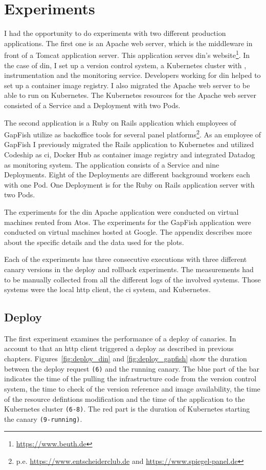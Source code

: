 \section{Experiments}

I had the opportunity to do experiments with two different production applications. The
first one is an Apache web server, which is the middleware in front of a Tomcat
application server. This application serves \gls{din}'s
website\footnote{\url{https://www.beuth.de}}. In the case of \gls{din}, I set up a version
control system, a Kubernetes cluster with \deployer, instrumentation and the monitoring
service. Developers working for \gls{din} helped to set up a container image
registry. I also migrated the Apache web server to be able to run on Kubernetes. The
Kubernetes resources for the Apache web server consisted of a Service and a Deployment
with two Pods.

The second application is a Ruby on Rails application which employees of GapFish utilize
as backoffice tools for several panel
platforms\footnote{p.e. \url{https://www.entscheiderclub.de} and
  \url{https://www.spiegel-panel.de}}. As an employee of GapFish I previously migrated the
Rails application to Kubernetes and utilized Codeship as \gls{ci}, Docker Hub as container
image registry and integrated Datadog as monitoring system. The application consists of a
Service and nine Deployments. Eight of the Deployments are different background workers
each with one Pod. One Deployment is for the Ruby on Rails application server with two
Pods.

The experiments for the \gls{din} Apache application were conducted on virtual machines
rented from Atos. The experiments for the GapFish application were conducted on virtual
machines hosted at Google. The appendix describes more about the specific details and the
data used for the plots.

Each of the experiments has three consecutive executions with three different canary
versions in the deploy and rollback experiments. The measurements had to be manually
collected from all the different logs of the involved systems. Those systems were the local http
client, the \gls{ci} system, \deployer and Kubernetes.

\subsection{Deploy}

The first experiment examines the performance of a deploy of canaries. In account to
that an http client triggered a deploy as described in previous
chapters. Figures~\ref{fig:deploy_din} and \ref{fig:deploy_gapfish} show the duration
between the deploy request \texttt{(6)} and the running canary. The blue part of the bar indicates
the time of the \deployer pulling the infrastructure code from the version control system,
the time to check of the version reference and image availability, the time of the resource defintions modification
and the time of the application to the Kubernetes cluster \texttt{(6-8)}. The red part is the duration
of Kubernetes starting the canary \texttt{(9-running)}.

